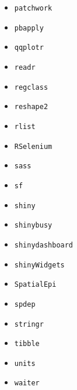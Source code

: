 \begin{itemize}
    \item \texttt{patchwork} \autocite[][]{patchwork}
    \item \texttt{pbapply} \autocite[][]{pbapply}
    \item \texttt{qqplotr} \autocite[][]{qqplotr}
    \item \texttt{readr} \autocite[][]{readr}
    \item \texttt{regclass} \autocite[][]{regclass}
    \item \texttt{reshape2} \autocite[][]{reshape2}
    \item \texttt{rlist} \autocite[][]{rlist}
    \item \texttt{RSelenium} \autocite[][]{RSelenium}
    \item \texttt{sass} \autocite[][]{sass}
    \item \texttt{sf} \autocite[][]{sf}
    \item \texttt{shiny} \autocite[][]{shiny}
    \item \texttt{shinybusy} \autocite[][]{shinybusy}
    \item \texttt{shinydashboard} \autocite[][]{shinydashboard}
    \item \texttt{shinyWidgets} \autocite[][]{shinyWidgets}
    \item \texttt{SpatialEpi} \autocite[][]{SpatialEpi}
    \item \texttt{spdep} \autocite[][]{spdep}
    \item \texttt{stringr} \autocite[][]{stringr}
    \item \texttt{tibble} \autocite[][]{tibble}
    \item \texttt{units} \autocite[][]{units}
    \item \texttt{waiter} \autocite[][]{waiter}
\end{itemize}